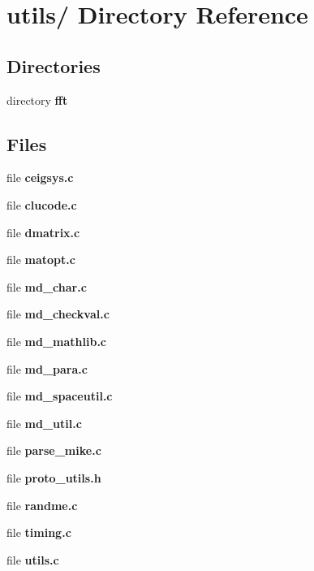 \section{utils/ Directory Reference}
\label{dir_e2ef8b6ec250921808a4aefbca78009c}
\subsection*{Directories}
\begin{CompactItemize}
\item 
directory {\bf fft}
\end{CompactItemize}
\subsection*{Files}
\begin{CompactItemize}
\item 
file {\bf ceigsys.c}
\item 
file {\bf clucode.c}
\item 
file {\bf dmatrix.c}
\item 
file {\bf matopt.c}
\item 
file {\bf md\_\-char.c}
\item 
file {\bf md\_\-checkval.c}
\item 
file {\bf md\_\-mathlib.c}
\item 
file {\bf md\_\-para.c}
\item 
file {\bf md\_\-spaceutil.c}
\item 
file {\bf md\_\-util.c}
\item 
file {\bf parse\_\-mike.c}
\item 
file {\bf proto\_\-utils.h}
\item 
file {\bf randme.c}
\item 
file {\bf timing.c}
\item 
file {\bf utils.c}
\end{CompactItemize}
